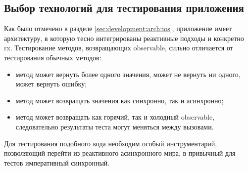 \subsection{Выбор технологий для тестирования приложения}
\label{sec:testing:tech}

Как было отмечено в разделе \ref{sec:development:arch:ios}, приложение имеет архитектуру, в которую тесно интегрированы реактивные подходы и конкретно \gls{rx}. Тестирование методов, возвращающих \gls{observable}, сильно отличается от тестирования обычных методов:

\begin{itemize}
	\item метод может вернуть более одного значения, может не вернуть ни одного, может вернуть ошибку;
	\item метод может возвращать значения как синхронно, так и асинхронно;
	\item метод может возвращать как горячий, так и холодный \gls{observable}, следовательно результаты теста могут меняться между вызовами.
\end{itemize}

Для тестирования подобного кода необходим особый инструментарий, позволяющий перейти из реактивного асинхронного мира, в привычный для тестов императивный синхронный.


